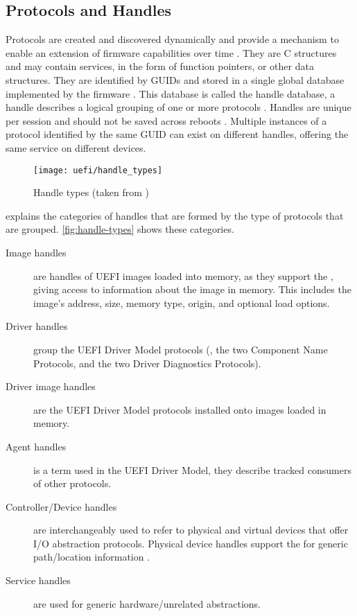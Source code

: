 \subsection{Protocols and Handles}

Protocols are created and discovered dynamically and provide a mechanism to enable an extension of firmware capabilities over time \cite[Section 3.6]{tianocore-edk2-driver-writer-s-guide}.
They are C structures and may contain services, in the form of function pointers, or other data structures.
They are identified by \acp{GUID} and stored in a single global database implemented by the firmware \cite{beyond-bios}.
This database is called the handle database, a handle describes a logical grouping of one or more protocols \cite[Section 3.6]{tianocore-edk2-driver-writer-s-guide}.
Handles are unique per session and should not be saved across reboots \cite{beyond-bios}.
Multiple instances of a protocol identified by the same \ac{GUID} can exist on different handles, offering the same service on different devices.

\begin{figure}[htb]%
    \centering%
    \texttt{[image: uefi/handle\_types]}%
    \caption[Handle types]{Handle types (taken from \cite[Figure 3]{tianocore-edk2-driver-writer-s-guide})}%
    \label{fig:handle-types}%
\end{figure}

\cite{tianocore-edk2-driver-writer-s-guide} explains the categories of handles that are formed by the type of protocols that are grouped. \autoref{fig:handle-types} shows these categories.

\begin{description}
    \item[Image handles] are handles of \ac{UEFI} images loaded into memory, as they support the , giving access to information about the image in memory. This includes the image's address, size, memory type, origin, and optional load options.
    \item[Driver handles] group the \ac{UEFI} Driver Model protocols (, the two Component Name Protocols, and the two Driver Diagnostics Protocols).
    \item[Driver image handles] are the \ac{UEFI} Driver Model protocols installed onto images loaded in memory.
    \item[Agent handles] is a term used in the \ac{UEFI} Driver Model, they describe tracked consumers of other protocols.
    \item[Controller/Device handles] are interchangeably used to refer to physical and virtual devices that offer \ac{I/O} abstraction protocols.
        Physical device handles support the  for generic path/location information \cite[Section 10.2]{uefi-spec}.
    \item[Service handles] are used for generic hardware\-/unrelated abstractions.
\end{description}


